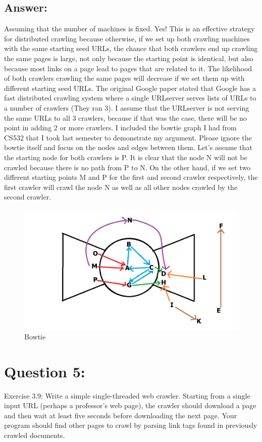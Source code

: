 \documentclass[a4paper, 11pt]{article}
\begin{document}
\subsection*{Answer:}
Assuming that the number of machines is fixed. Yes! This is an effective strategy for distributed crawling because otherwise, if we set up both crawling machines with the same starting seed URLs, the chance that both crawlers end up crawling the same pages is large, not only because the starting point is identical, but also because most links on a page lead to pages that are related to it. The likelihood of both crawlers crawling the same pages will decrease if we set them up with different starting seed URLs. The original Google paper stated that Google has a fast distributed crawling system where a single URLserver serves lists of URLs to a number of crawlers (They ran 3). I assume that the URLserver is not serving the same URLs to all 3 crawlers, because if that was the case, there will be no point in adding 2 or more crawlers. I included the bowtie graph I had from CS532 that I took last semester to demonstrate my argument. Please ignore the bowtie itself and focus on the nodes and edges between them. Let's assume that the starting node for both crawlers is P. It is clear that the node N will not be crawled because there is no path from P to N. On the other hand, if we set two different starting points M and P for the first and second crawler respectively, the first crawler will crawl the node N as well as all other nodes crawled by the second crawler.

\begin{figure}[h]
\caption{Bowtie}
\centering
\includegraphics[scale=0.5]{Q4/bowtie.png}
\end{figure}

\section*{Question 5:}
Exercise 3.9: Write a simple single-threaded web crawler. Starting from a single input URL (perhaps a professor’s web page), the crawler should download a page and then wait at least five seconds before downloading the next page. Your program should find other pages to crawl by parsing link tags found in previously crawled documents.
\end{document}
